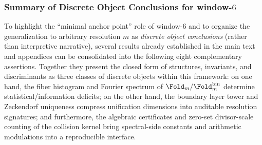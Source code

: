 \subsubsection{Summary of Discrete Object Conclusions for window-\texorpdfstring{\(6\)}{6}}\label{subsubsec:window6-discrete-results}
To highlight the ``minimal anchor point'' role of window-\(6\) and to organize the generalization to arbitrary resolution \(m\) as \emph{discrete object conclusions} (rather than interpretive narrative), several results already established in the main text and appendices can be consolidated into the following eight complementary assertions.
Together they present the closed form of structures, invariants, and discriminants as three classes of discrete objects within this framework: on one hand, the fiber histogram and Fourier spectrum of \(\Fold_m/\Fold^{\mathrm{bin}}_m\) determine statistical/information deficits; on the other hand, the boundary layer tower and Zeckendorf uniqueness compress unification dimensions into auditable resolution signatures; and furthermore, the algebraic certificates and zero-set divisor-scale counting of the collision kernel bring spectral-side constants and arithmetic modulations into a reproducible interface.

